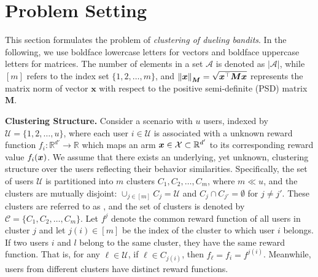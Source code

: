 \section{Problem Setting}\label{sec: setting}

This section formulates the problem of \emph{clustering of dueling bandits}. In the following, we use boldface lowercase letters for vectors and boldface uppercase letters for matrices. The number of elements in a set \( \mathcal{A} \) is denoted as \( |\mathcal{A}| \), while \( [m] \) refers to the index set \( \{1, 2, \dots, m\} \), and \( \left\| \boldsymbol{x} \right\|_{\boldsymbol{M}} = \sqrt{\boldsymbol{x}^{\top}\boldsymbol{M}\boldsymbol{x}} \) represents the matrix norm of vector \( \boldsymbol{x} \) with respect to the positive semi-definite (PSD) matrix \( \boldsymbol{M} \).

\textbf{Clustering Structure.}
Consider a scenario with \( u \) users, indexed by \( \mathcal{U} = \{1, 2, \dots, u\} \), where each user \( i \in \mathcal{U} \) 
is associated with a unknown 
reward function $f_i: \mathbb{R}^{d'} \rightarrow \mathbb{R}$ which maps an arm $\boldsymbol{x} \in \mathcal{X}\subset\mathbb{R}^{d'}$ to its corresponding reward value $f_i(\boldsymbol{x})$.
We assume that there exists an underlying, yet unknown, clustering structure over the users reflecting their behavior similarities. Specifically, the set of users \( \mathcal{U} \) is partitioned into \( m \) clusters \( C_1, C_2, \dots, C_m \), where \( m \ll u \), and the clusters are mutually disjoint: \( \cup_{j \in [m]} C_j = \mathcal{U} \) and \( C_j \cap C_{j'} = \emptyset \) for \( j \neq j' \). These clusters are referred to as \gtclusters{}, and the set of clusters is denoted by \( \mathcal{C} = \{C_1, C_2, \dots, C_m\} \). 
Let $f^j$ denote the common reward function of all users in cluster $j$ and let \( j(i) \in [m] \) be the index of the cluster to which user \( i \) belongs.
If two users $i$ and $l$ belong to the same cluster, they have the same reward function.
That is, for any $\ell \in \mathcal{U}$, if $\ell \in C_{j(i)}$, then $f_\ell = f_i = f^{j(i)}$.
Meanwhile, users from different clusters have distinct 
reward functions.

